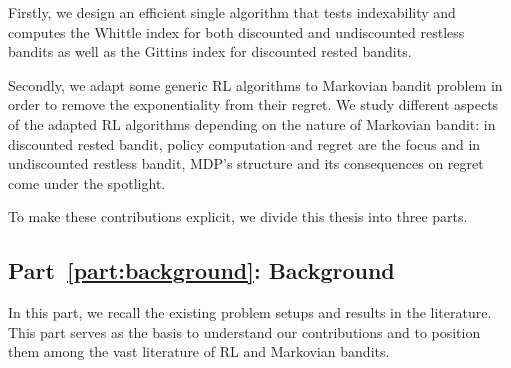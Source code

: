 
Firstly, we design an efficient single algorithm that tests indexability and computes the Whittle index for both discounted and undiscounted restless bandits as well as the Gittins index for discounted rested bandits.

Secondly, we adapt some generic RL algorithms to Markovian bandit problem in order to remove the exponentiality from their regret.
We study different aspects of the adapted RL algorithms depending on the nature of Markovian bandit: in discounted rested bandit, policy computation and regret are the focus and in undiscounted restless bandit, MDP's structure and its consequences on regret come under the spotlight.

To make these contributions explicit, we divide this thesis into three parts.

\subsection{Part~{\ref{part:background}}: Background}

In this part, we recall the existing problem setups and results in the literature.
This part serves as the basis to understand our contributions and to position them among the vast literature of RL and Markovian bandits.

